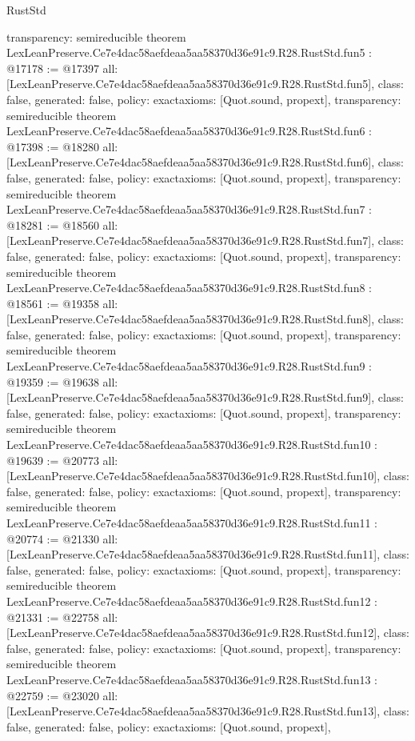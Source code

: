 \begin{lexlean}{RustStd}
\begin{coremodule}
{  transparency: semireducible
}
theorem LexLeanPreserve.Ce7e4dac58aefdeaa5aa58370d36e91c9.R28.RustStd.fun5 : @17178 := @17397 {
  all: [LexLeanPreserve.Ce7e4dac58aefdeaa5aa58370d36e91c9.R28.RustStd.fun5],
  class: false,
  generated: false,
  policy: exact{axioms: [Quot.sound, propext]},
  transparency: semireducible
}
theorem LexLeanPreserve.Ce7e4dac58aefdeaa5aa58370d36e91c9.R28.RustStd.fun6 : @17398 := @18280 {
  all: [LexLeanPreserve.Ce7e4dac58aefdeaa5aa58370d36e91c9.R28.RustStd.fun6],
  class: false,
  generated: false,
  policy: exact{axioms: [Quot.sound, propext]},
  transparency: semireducible
}
theorem LexLeanPreserve.Ce7e4dac58aefdeaa5aa58370d36e91c9.R28.RustStd.fun7 : @18281 := @18560 {
  all: [LexLeanPreserve.Ce7e4dac58aefdeaa5aa58370d36e91c9.R28.RustStd.fun7],
  class: false,
  generated: false,
  policy: exact{axioms: [Quot.sound, propext]},
  transparency: semireducible
}
theorem LexLeanPreserve.Ce7e4dac58aefdeaa5aa58370d36e91c9.R28.RustStd.fun8 : @18561 := @19358 {
  all: [LexLeanPreserve.Ce7e4dac58aefdeaa5aa58370d36e91c9.R28.RustStd.fun8],
  class: false,
  generated: false,
  policy: exact{axioms: [Quot.sound, propext]},
  transparency: semireducible
}
theorem LexLeanPreserve.Ce7e4dac58aefdeaa5aa58370d36e91c9.R28.RustStd.fun9 : @19359 := @19638 {
  all: [LexLeanPreserve.Ce7e4dac58aefdeaa5aa58370d36e91c9.R28.RustStd.fun9],
  class: false,
  generated: false,
  policy: exact{axioms: [Quot.sound, propext]},
  transparency: semireducible
}
theorem LexLeanPreserve.Ce7e4dac58aefdeaa5aa58370d36e91c9.R28.RustStd.fun10 : @19639 := @20773 {
  all: [LexLeanPreserve.Ce7e4dac58aefdeaa5aa58370d36e91c9.R28.RustStd.fun10],
  class: false,
  generated: false,
  policy: exact{axioms: [Quot.sound, propext]},
  transparency: semireducible
}
theorem LexLeanPreserve.Ce7e4dac58aefdeaa5aa58370d36e91c9.R28.RustStd.fun11 : @20774 := @21330 {
  all: [LexLeanPreserve.Ce7e4dac58aefdeaa5aa58370d36e91c9.R28.RustStd.fun11],
  class: false,
  generated: false,
  policy: exact{axioms: [Quot.sound, propext]},
  transparency: semireducible
}
theorem LexLeanPreserve.Ce7e4dac58aefdeaa5aa58370d36e91c9.R28.RustStd.fun12 : @21331 := @22758 {
  all: [LexLeanPreserve.Ce7e4dac58aefdeaa5aa58370d36e91c9.R28.RustStd.fun12],
  class: false,
  generated: false,
  policy: exact{axioms: [Quot.sound, propext]},
  transparency: semireducible
}
theorem LexLeanPreserve.Ce7e4dac58aefdeaa5aa58370d36e91c9.R28.RustStd.fun13 : @22759 := @23020 {
  all: [LexLeanPreserve.Ce7e4dac58aefdeaa5aa58370d36e91c9.R28.RustStd.fun13],
  class: false,
  generated: false,
  policy: exact{axioms: [Quot.sound, propext]},
}
\end{coremodule}
\end{lexlean}
